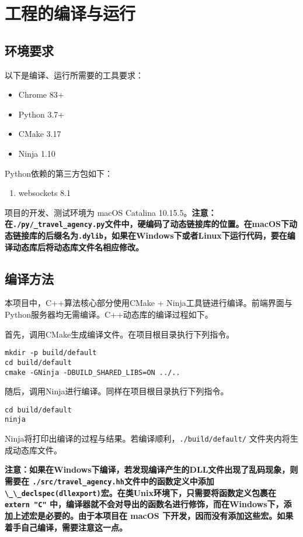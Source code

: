 \section{工程的编译与运行}
\label{sec:compile-and-run}

\subsection{环境要求}

以下是编译、运行所需要的工具要求：
\begin{itemize}
  \item Chrome 83+
  \item Python 3.7+
  \item CMake 3.17
  \item Ninja 1.10
\end{itemize}

Python依赖的第三方包如下：
\begin{enumerate}
  \item websockets 8.1
\end{enumerate}

项目的开发、测试环境为 macOS Catalina 10.15.5。\textbf{注意：在\texttt{./py/\_travel\_agency.py}文件中，硬编码了动态链接库的位置。在macOS下动态链接库的后缀名为\texttt{.dylib}，如果在Windows下或者Linux下运行代码，要在编译动态库后将动态库文件名相应修改。}

\subsection{编译方法}

本项目中，C++算法核心部分使用CMake + Ninja工具链进行编译。前端界面与Python服务器均无需编译。C++动态库的编译过程如下。

首先，调用CMake生成编译文件。在项目根目录执行下列指令。
\begin{verbatim}
mkdir -p build/default
cd build/default
cmake -GNinja -DBUILD_SHARED_LIBS=ON ../..
\end{verbatim}

随后，调用Ninja进行编译。同样在项目根目录执行下列指令。
\begin{verbatim}
cd build/default
ninja
\end{verbatim}

Ninja将打印出编译的过程与结果。若编译顺利，\texttt{./build/default/} 文件夹内将生成动态库文件。

\textbf{注意：如果在Windows下编译，若发现编译产生的DLL文件出现了乱码现象，则需要在 \texttt{./src/travel\_agency.hh}文件中的函数定义中添加 \lstinline{\_\_declspec(dllexport)}宏。在类Unix环境下，只需要将函数定义包裹在 \lstinline{extern "C"} 中，编译器就不会对导出的函数名进行修饰，而在Windows下，添加上述宏是必要的。由于本项目在 macOS 下开发，因而没有添加这些宏。如果着手自己编译，需要注意这一点。}

